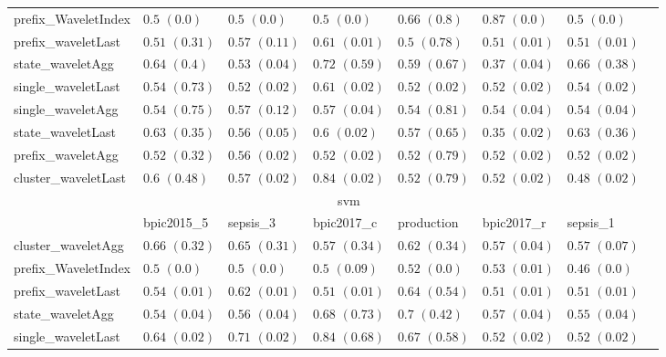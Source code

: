 \documentclass[twoside,11pt]{Latex/Classes/PhDthesisPSnPDF}
\begin{document}
\begin{table}[h]
{\begin{tabular}{llllllll}
			prefix\_WaveletIndex & $0.5$ ${(0.0)}$ & $0.5$ ${(0.0)}$ & $0.5$ ${(0.0)}$ & $0.66$ ${(0.8)}$ & $0.87$ ${(0.0)}$ & $0.5$ ${(0.0)}$ \\
			prefix\_waveletLast & $0.51$ ${(0.31)}$ & $0.57$ ${(0.11)}$ & $0.61$ ${(0.01)}$ & $0.5$ ${(0.78)}$ & $0.51$ ${(0.01)}$ & $0.51$ ${(0.01)}$ \\
			state\_waveletAgg & $0.64$ ${(0.4)}$ & $0.53$ ${(0.04)}$ & $0.72$ ${(0.59)}$ & $0.59$ ${(0.67)}$ & $0.37$ ${(0.04)}$ & $0.66$ ${(0.38)}$ \\
			single\_waveletLast & $0.54$ ${(0.73)}$ & $0.52$ ${(0.02)}$ & $0.61$ ${(0.02)}$ & $0.52$ ${(0.02)}$ & $0.52$ ${(0.02)}$ & $0.54$ ${(0.02)}$ \\
			single\_waveletAgg & $0.54$ ${(0.75)}$ & $0.57$ ${(0.12)}$ & $0.57$ ${(0.04)}$ & $0.54$ ${(0.81)}$ & $0.54$ ${(0.04)}$ & $0.54$ ${(0.04)}$ \\
			state\_waveletLast & $0.63$ ${(0.35)}$ & $0.56$ ${(0.05)}$ & $0.6$ ${(0.02)}$ & $0.57$ ${(0.65)}$ & $0.35$ ${(0.02)}$ & $0.63$ ${(0.36)}$ \\
			prefix\_waveletAgg & $0.52$ ${(0.32)}$ & $0.56$ ${(0.02)}$ & $0.52$ ${(0.02)}$ & $0.52$ ${(0.79)}$ & $0.52$ ${(0.02)}$ & $0.52$ ${(0.02)}$ \\
			cluster\_waveletLast & $0.6$ ${(0.48)}$ & $0.57$ ${(0.02)}$ & $0.84$ ${(0.02)}$ & $0.52$ ${(0.79)}$ & $0.52$ ${(0.02)}$ & $0.48$ ${(0.02)}$ \\
			\bottomrule
			\toprule
			& \multicolumn{5}{c}{svm}
			\\
			& bpic2015\_5 & sepsis\_3 & bpic2017\_c & production & bpic2017\_r & sepsis\_1
			\\ \midrule
			cluster\_waveletAgg & $0.66$ ${(0.32)}$ & $0.65$ ${(0.31)}$ & $0.57$ ${(0.34)}$ & $0.62$ ${(0.34)}$ & $0.57$ ${(0.04)}$ & $0.57$ ${(0.07)}$ \\
			prefix\_WaveletIndex & $0.5$ ${(0.0)}$ & $0.5$ ${(0.0)}$ & $0.5$ ${(0.09)}$ & $0.52$ ${(0.0)}$ & $0.53$ ${(0.01)}$ & $0.46$ ${(0.0)}$ \\
			prefix\_waveletLast & $0.54$ ${(0.01)}$ & $0.62$ ${(0.01)}$ & $0.51$ ${(0.01)}$ & $0.64$ ${(0.54)}$ & $0.51$ ${(0.01)}$ & $0.51$ ${(0.01)}$ \\
			state\_waveletAgg & $0.54$ ${(0.04)}$ & $0.56$ ${(0.04)}$ & $0.68$ ${(0.73)}$ & $0.7$ ${(0.42)}$ & $0.57$ ${(0.04)}$ & $0.55$ ${(0.04)}$ \\
			single\_waveletLast & $0.64$ ${(0.02)}$ & $0.71$ ${(0.02)}$ & $\mathbf{0.84}$ $\mathbf{(0.68)}$  & $0.67$ ${(0.58)}$ & $0.52$ ${(0.02)}$ & $0.52$ ${(0.02)}$ \\

\end{tabular}}
\end{table}
\end{document}
